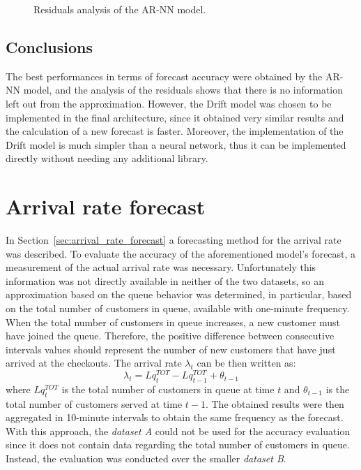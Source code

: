 \begin{figure}
  \begin{center}
  \end{center}
  \caption{Residuals analysis of the AR-NN model.}
  \label{fig:inflow_rate_forecast_residuals}
\end{figure}

\subsection{Conclusions}
\label{subsec:inflow_rate_forecast_results_conclusions}

The best performances in terms of forecast accuracy were obtained by the AR-NN model, and the analysis of the residuals shows that there is no information left out from the approximation. However, the Drift model was chosen to be implemented in the final architecture, since it obtained very similar results and the calculation of a new forecast is faster. Moreover, the implementation of the Drift model is much simpler than a neural network, thus it can be implemented directly without needing any additional library.

\section{Arrival rate forecast}
\label{sec:arrival_rate_forecast_results}

In Section~\ref{sec:arrival_rate_forecast} a forecasting method for the arrival rate was described. To evaluate the accuracy of the aforementioned model’s forecast, a measurement of the actual arrival rate was necessary. Unfortunately this information was not directly available in neither of the two datasets, so an approximation based on the queue behavior was determined, in particular, based on the total number of customers in queue, available with one-minute frequency. When the total number of customers in queue increases, a new customer must have joined the queue. Therefore, the positive difference between consecutive intervals values should represent the number of new customers that have just arrived at the checkouts. The arrival rate \( \lambda_t \) can be then written as:
\begin{equation}
  \lambda_t = Lq_t^{TOT} - Lq_{t-1}^{TOT} + \theta_{t-1}
\end{equation}
where \( Lq_t^{TOT} \) is the total number of customers in queue at time \( t \) and \( \theta_{t-1} \) is the total number of customers served at time \( t-1 \). The obtained results were then aggregated in 10-minute intervals to obtain the same frequency as the forecast. With this approach, the \emph{dataset A} could not be used for the accuracy evaluation since it does not contain data regarding the total number of customers in queue. Instead, the evaluation was conducted over the smaller \emph{dataset B}.

